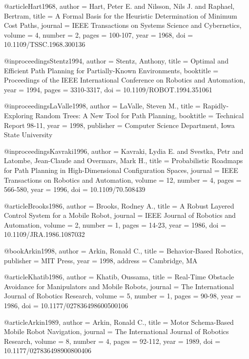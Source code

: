 @article{Hart1968,
  author = {Hart, Peter E. and Nilsson, Nils J. and Raphael, Bertram},
  title = {A Formal Basis for the Heuristic Determination of Minimum Cost Paths},
  journal = {IEEE Transactions on Systems Science and Cybernetics},
  volume = {4},
  number = {2},
  pages = {100-107},
  year = {1968},
  doi = {10.1109/TSSC.1968.300136}
}

@inproceedings{Stentz1994,
  author = {Stentz, Anthony},
  title = {Optimal and Efficient Path Planning for Partially-Known Environments},
  booktitle = {Proceedings of the IEEE International Conference on Robotics and Automation},
  year = {1994},
  pages = {3310-3317},
  doi = {10.1109/ROBOT.1994.351061}
}

@inproceedings{LaValle1998,
  author = {LaValle, Steven M.},
  title = {Rapidly-Exploring Random Trees: A New Tool for Path Planning},
  booktitle = {Technical Report 98-11},
  year = {1998},
  publisher = {Computer Science Department, Iowa State University}
}

@inproceedings{Kavraki1996,
  author = {Kavraki, Lydia E. and Svestka, Petr and Latombe, Jean-Claude and Overmars, Mark H.},
  title = {Probabilistic Roadmaps for Path Planning in High-Dimensional Configuration Spaces},
  journal = {IEEE Transactions on Robotics and Automation},
  volume = {12},
  number = {4},
  pages = {566-580},
  year = {1996},
  doi = {10.1109/70.508439}
}

@article{Brooks1986,
  author = {Brooks, Rodney A.},
  title = {A Robust Layered Control System for a Mobile Robot},
  journal = {IEEE Journal of Robotics and Automation},
  volume = {2},
  number = {1},
  pages = {14-23},
  year = {1986},
  doi = {10.1109/JRA.1986.1087032}
}

@book{Arkin1998,
  author = {Arkin, Ronald C.},
  title = {Behavior-Based Robotics},
  publisher = {MIT Press},
  year = {1998},
  address = {Cambridge, MA}
}

@article{Khatib1986,
  author = {Khatib, Oussama},
  title = {Real-Time Obstacle Avoidance for Manipulators and Mobile Robots},
  journal = {The International Journal of Robotics Research},
  volume = {5},
  number = {1},
  pages = {90-98},
  year = {1986},
  doi = {10.1177/027836498600500106}
}

@article{Arkin1989,
  author = {Arkin, Ronald C.},
  title = {Motor Schema-Based Mobile Robot Navigation},
  journal = {The International Journal of Robotics Research},
  volume = {8},
  number = {4},
  pages = {92-112},
  year = {1989},
  doi = {10.1177/027836498900800406}
}

